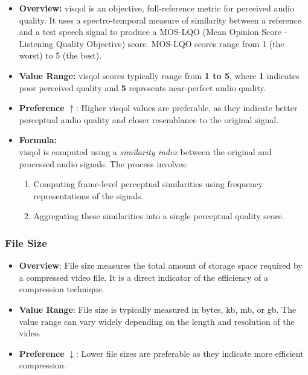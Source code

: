 \documentclass{ioereport}
\begin{document}
\begin{itemize}
    \item \textbf{Overview:} \gls{visqol} is an objective, full-reference metric for perceived audio quality. It uses a spectro-temporal measure of similarity between a reference and a test speech signal to produce a MOS-LQO (Mean Opinion Score - Listening Quality Objective) score. MOS-LQO scores range from 1 (the worst) to 5 (the best).

    \item \textbf{Value Range:} \gls{visqol} scores typically range from \textbf{1 to 5}, where \textbf{1} indicates poor perceived quality and \textbf{5} represents near-perfect audio quality.

    \item \textbf{Preference} $\uparrow$: Higher \gls{visqol} values are preferable, as they indicate better perceptual audio quality and closer resemblance to the original signal.

    \item \textbf{Formula:} \\
    \gls{visqol} is computed using a \textit{similarity index} between the original and processed audio signals. The process involves:
    \begin{enumerate}
        \item Computing frame-level perceptual similarities using frequency representations of the signals.
        \item Aggregating these similarities into a single perceptual quality score.
    \end{enumerate}
\end{itemize}

\subsubsection{File Size}
            \begin{itemize}
                \item \textbf{Overview}: File size measures the total amount of storage space required by a compressed video file. It is a direct indicator of the efficiency of a compression technique.
                \item \textbf{Value Range}: File size is typically measured in bytes, \gls{kb}, \gls{mb}, or \gls{gb}. The value range can vary widely depending on the length and resolution of the video.
                \item \textbf{Preference} $\downarrow$: Lower file sizes are preferable as they indicate more efficient compression.
            \end{itemize}
\end{document}
